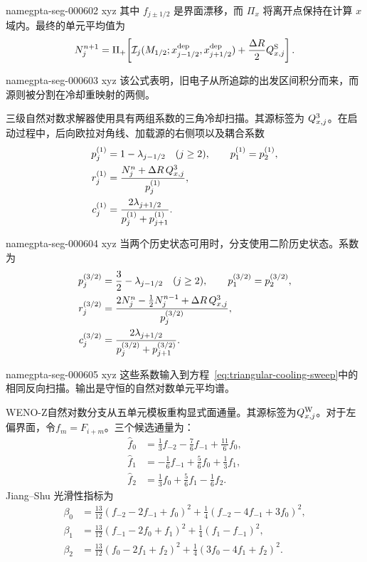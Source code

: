 \documentclass[twocolumn]{aastex702}
\makeatletter
\providecommand{\gptareaderanchor}[1]{\pdfdest name{#1} xyz}%
\providecommand{\gptareaderanchor}[1]{\special{pdf:dest (#1) [ @thispage /XYZ @xpos @ypos null ]}}%
\makeatother
\begin{document}
\gptareaderanchor{gpta-seg-000602}%
其中 \(f_{j\pm1/2}\) 是界面漂移，而 \(\Pi_x\) 将离开点保持在计算 \(x\) 域内。最终的单元平均值为
\begin{equation}
N_j^{n+1}
=\Pi_+\!\left[
\mathcal I_j(M_{1/2};x_{j-1/2}^{\rm dep},x_{j+1/2}^{\rm dep})
+\frac{\Delta R}{2}Q_{x,j}^{\rm S}
\right].
\end{equation}

\gptareaderanchor{gpta-seg-000603}%
该公式表明，旧电子从所追踪的出发区间积分而来，而源则被分割在冷却重映射的两侧。

三级自然对数求解器使用具有两组系数的三角冷却扫描。其源标签为 \(Q_{x,j}^{\rm 3}\)。在启动过程中，后向欧拉对角线、加载源的右侧项以及耦合系数
\begin{equation}
\begin{aligned}
p_j^{(1)}&=1-\lambda_{j-1/2}\quad (j\ge2),\qquad p_1^{(1)}=p_2^{(1)},\\
r_j^{(1)}&=\frac{N_j^n+\Delta R\,Q_{x,j}^{\rm 3}}{p_j^{(1)}},\\
c_j^{(1)}&=\frac{2\lambda_{j+1/2}}{p_j^{(1)}+p_{j+1}^{(1)}} .
\end{aligned}
\end{equation}

\gptareaderanchor{gpta-seg-000604}%
当两个历史状态可用时，分支使用二阶历史状态。系数为
\begin{equation}
\begin{aligned}
p_j^{(3/2)}&=\frac{3}{2}-\lambda_{j-1/2}\quad (j\ge2),\qquad
p_1^{(3/2)}=p_2^{(3/2)},\\
r_j^{(3/2)}&=
\frac{2N_j^n-\frac{1}{2}N_j^{n-1}+\Delta R\,Q_{x,j}^{\rm 3}}
{p_j^{(3/2)}},\\
c_j^{(3/2)}&=
\frac{2\lambda_{j+1/2}}{p_j^{(3/2)}+p_{j+1}^{(3/2)}} .
\end{aligned}
\end{equation}

\gptareaderanchor{gpta-seg-000605}%
这些系数输入到方程~\ref{eq:triangular-cooling-sweep}中的相同反向扫描。输出是守恒的自然对数单元平均谱。

WENO-Z自然对数分支从五单元模板重构显式面通量。其源标签为\(Q_{x,j}^{\rm W}\)。对于左偏界面，令\(f_m=F_{i+m}\)。三个候选通量为：
\begin{equation}
\begin{aligned}
\hat f_0&=\frac{1}{3}f_{-2}-\frac{7}{6}f_{-1}+\frac{11}{6}f_0,\\
\hat f_1&=-\frac{1}{6}f_{-1}+\frac{5}{6}f_0+\frac{1}{3}f_1,\\
\hat f_2&=\frac{1}{3}f_0+\frac{5}{6}f_1-\frac{1}{6}f_2 .
\end{aligned}
\end{equation}
Jiang--Shu 光滑性指标为
\begin{equation}
\begin{aligned}
\beta_0&=\frac{13}{12}(f_{-2}-2f_{-1}+f_0)^2
+\frac{1}{4}(f_{-2}-4f_{-1}+3f_0)^2,\\
\beta_1&=\frac{13}{12}(f_{-1}-2f_0+f_1)^2
+\frac{1}{4}(f_1-f_{-1})^2,\\
\beta_2&=\frac{13}{12}(f_0-2f_1+f_2)^2
+\frac{1}{4}(3f_0-4f_1+f_2)^2 .
\end{aligned}
\end{equation}
\end{document}
